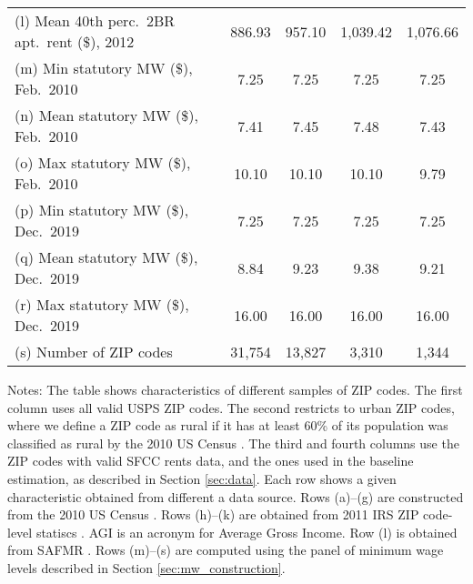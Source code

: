 \begin{landscape}
\begin{table}[hbt!]
\begin{tabular}{@{}lcccc@{}}
        (l) Mean 40th perc.\ 2BR apt.\ rent (\$), 2012   & 886.93   & 957.10  & 1,039.42  & 1,076.66     \\
        (m) Min statutory MW (\$), Feb.\ 2010            & 7.25   & 7.25  & 7.25  & 7.25                \\
        (n) Mean statutory MW (\$), Feb.\ 2010           & 7.41   & 7.45  & 7.48  & 7.43                \\
        (o) Max statutory MW (\$), Feb.\ 2010            & 10.10   & 10.10  & 10.10  & 9.79              \\
        (p) Min statutory MW (\$), Dec.\ 2019            & 7.25   & 7.25  & 7.25  & 7.25                 \\
        (q) Mean statutory MW (\$), Dec.\ 2019           & 8.84   & 9.23  & 9.38  & 9.21                 \\
        (r) Max statutory MW (\$), Dec.\ 2019            & 16.00   & 16.00  & 16.00  & 16.00              \\
        (s) Number of ZIP codes                          & 31,754  & 13,827 & 3,310 & 1,344               \\ \bottomrule
    \end{tabular}

    \begin{minipage}{.95\linewidth} \footnotesize
        \vspace{2mm}
        Notes: The table shows characteristics of different samples of ZIP codes.
        The first column uses all valid USPS ZIP codes.
        The second restricts to urban ZIP codes, where we define a ZIP code as 
        rural if it has at least 60\% of its population was classified as rural 
        by the 2010 US Census \parencite{CensusDecennial}.
        The third and fourth columns use the ZIP codes with valid SFCC rents 
        data, and the ones used in the baseline estimation, as described in
        Section \ref{sec:data}.
        Each row shows a given characteristic obtained from different a data 
        source.
        Rows (a)--(g) are constructed from the 2010 US Census \parencite{CensusDecennial}.
        Rows (h)--(k) are obtained from 2011 IRS ZIP code-level statiscs 
        \parencite{IRS}. AGI is an acronym for Average Gross Income.
        Row (l) is obtained from SAFMR \parencite{hudSAFMR}.
        Rows (m)--(s) are computed using the panel of minimum wage levels 
        described in Section \ref{sec:mw_construction}.
    \end{minipage}
\end{table}
\end{landscape}
